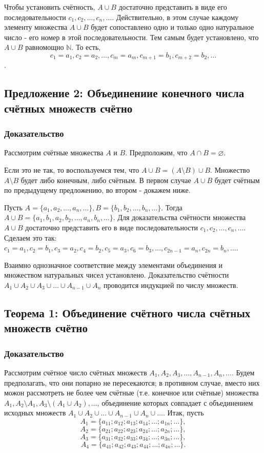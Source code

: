 \documentclass{article}
\begin{document}
Чтобы установить счётность, $A \cup B$ достаточно представить в виде его последовательности $c_1, c_2, \dots, c_n, \dots$. Действительно, в этом случае каждому элементу множества $A \cup B$ будет сопоставлено одно и только одно натуральное число - его номер в этой последовательности. Тем самым будет установлено, что $A \cup B$ равномощно $\mathbb{N}$. То есть, \[c_1 = a_1, c_2 = a_2, \dots, c_m = a_m, c_{m+1} = b_1, c_{m+2} = b_2, \dots\].


\subsection{Предложение 2: Объединениие конечного числа счётных множеств счётно}
\subsubsection*{Доказательство}

Рассмотрим счётные множества $A$ и $B$. Предположим, что $A \cap B = \varnothing$.

Если это не так, то воспользуемся тем, что $A \cup B = (A \setminus B) \cup B$. Множество $A \setminus B$ будет либо конечным, либо счётным. В первом случае $A \cup B$ будет счётным по предыдущему предложению, во втором - докажем ниже.

Пусть ${A = \{a_1, a_2, \dots, a_n, \dots \}}, {B = \{b_1, b_2, \dots, b_n, \dots\}}$. Тогда ${A \cup B = \{a_1, b_1, a_2, b_2, \dots, a_n, b_n, \dots\}}$. Для доказательства счётности множества $A \cup B$ достаточно представить его в виде последовательности $c_1, c_2, \dots, c_n, \dots$. Сделаем это так: $c_1 = a_1, c_2 = b_1, c_3 = a_2, c_4 = b_2, c_5 = a_3, c_6 = b_3, \dots, c_{2n-1} = a_n, c_{2n} = b_n, \dots$.

Взаимно однозначное соответствие между элементами объединения и множеством натуральных чисел установлено. Доказательство счётности $A_1 \cup A_2 \cup A_3 \cup \dots \cup A_{n-1} \cup A_n$ проводится индукцией по числу множеств.

\subsection{Теорема 1: Объединение счётного числа счётных множеств счётно}
\subsubsection*{Доказательство}
Рассмотрим счётное число счётных множеств $A_1, A_2, A_3, \dots, A_{n-1}, A_n, \dots$. Будем предполагать, что они попарно не пересекаются; в противном случае, вместо них можон рассмотреть не более чем счётные (т.е. конечное или счётные) множества ${A_1, A_2 \setminus A_1, A_3 \setminus (A_1 \cup A_2), \dots}$, объединение которых совпадает с объединением исходных множеств ${A_1 \cup A_2 \cup ... \cup A_{n-1} \cup A_n \cup \dots}$. Итак, пусть \[
	A_1 = \{a_{11}; a_{12}; a_{13}; a_{14}; \dots; a_{1n}; \dots \}, \]\[
	A_2 = \{a_{21}; a_{22}; a_{23}; a_{24}; \dots; a_{2n}; \dots \}, \]\[
	A_3 = \{a_{31}; a_{32}; a_{33}; a_{34}; \dots; a_{3n}; \dots \}, \]\[
	A_4 = \{a_{41}; a_{42}; a_{43}; a_{44}; \dots; a_{4n}; \dots \}.
\]	
\end{document}
